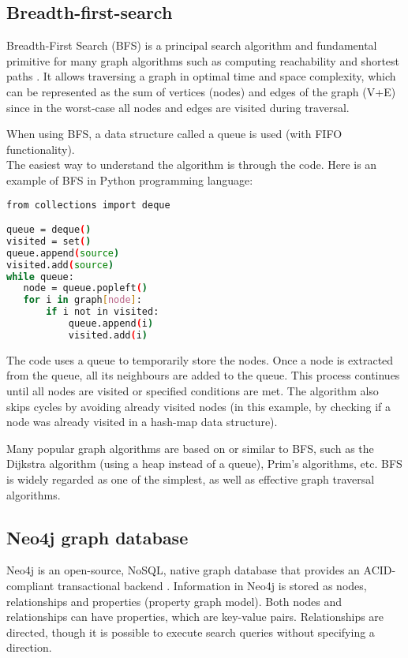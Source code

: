\subsection{Breadth-first-search}
\label{cha:breadth-first-search}
Breadth-First Search (BFS) is a principal search algorithm and fundamental primitive for many graph algorithms such as computing reachability and shortest paths \cite{Optimal-1906031125:online}. It allows traversing a graph in optimal time and space complexity, which can be represented as the sum of vertices (nodes) and edges of the graph (V+E) since in the worst-case all nodes and edges are visited during traversal.

\newpage
\noindent When using BFS, a data structure called a queue is used (with FIFO functionality).\\
\noindent The easiest way to understand the algorithm is through the code. Here is an example of BFS in Python programming language:
\\

\begin{lstlisting}[caption=Queue data structure in python, captionpos=b, language=bash, label={lst:queue-data-structure}]
from collections import deque

queue = deque()
visited = set()
queue.append(source)
visited.add(source)
while queue:
   node = queue.popleft()
   for i in graph[node]:
       if i not in visited:
           queue.append(i)
           visited.add(i)
\end{lstlisting}

The code uses a queue to temporarily store the nodes. Once a node is extracted from the queue, all its neighbours are added to the queue. This process continues until all nodes are visited or specified conditions are met. The algorithm also skips cycles by avoiding already visited nodes (in this example, by checking if a node was already visited in a hash-map data structure).

Many popular graph algorithms are based on or similar to BFS, such as the Dijkstra algorithm (using a heap instead of a queue), Prim's algorithms, etc. BFS is widely regarded as one of the simplest, as well as effective graph traversal algorithms.

\subsection{Neo4j graph database}
Neo4j is an open-source, NoSQL, native graph database that provides an ACID-compliant transactional backend \cite{Neo4J:online} . Information in Neo4j is stored as nodes, relationships and properties (property graph model). Both nodes and relationships can have properties, which are key-value pairs.
Relationships are directed, though it is possible to execute search queries without specifying a direction.

